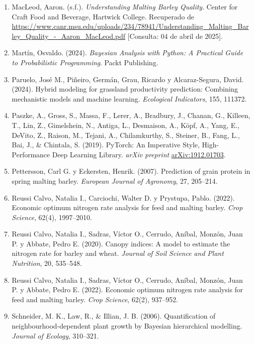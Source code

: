 \documentclass[
11pt, %
]{charter}
\begin{document}
\begin{enumerate}
    \item MacLeod, Aaron. (s.f.). \emph{Understanding Malting Barley Quality}. Center for Craft Food and Beverage, Hartwick College. Recuperado de \url{https://www.canr.msu.edu/uploads/234/78941/Understanding_Malting_Barley_Quality_-_Aaron_MacLeod.pdf} [Consulta: 04 de abril de 2025].

    \item Martín, Osvaldo. (2024). \emph{Bayesian Analysis with Python: A Practical Guide to Probabilistic Programming}. Packt Publishing.

    \item Paruelo, José M., Piñeiro, Germán, Grau, Ricardo y Alcaraz-Segura, David. (2024). Hybrid modeling for grassland productivity prediction: Combining mechanistic models and machine learning. \emph{Ecological Indicators}, 155, 111372.

    \item Paszke, A., Gross, S., Massa, F., Lerer, A., Bradbury, J., Chanan, G., Killeen, T., Lin, Z., Gimelshein, N., Antiga, L., Desmaison, A., Köpf, A., Yang, E., DeVito, Z., Raison, M., Tejani, A., Chilamkurthy, S., Steiner, B., Fang, L., Bai, J., \& Chintala, S. (2019). PyTorch: An Imperative Style, High-Performance Deep Learning Library. \emph{arXiv preprint} \url{arXiv:1912.01703}.

    \item Pettersson, Carl G. y Eckersten, Henrik. (2007). Prediction of grain protein in spring malting barley. \emph{European Journal of Agronomy}, 27, 205–214.

    \item Reussi Calvo, Natalia I., Carciochi, Walter D. y Prystupa, Pablo. (2022). Economic optimum nitrogen rate analysis for feed and malting barley. \emph{Crop Science}, 62(4), 1997–2010.

    \item Reussi Calvo, Natalia I., Sadras, Víctor O., Cerrudo, Aníbal, Monzón, Juan P. y Abbate, Pedro E. (2020). Canopy indices: A model to estimate the nitrogen rate for barley and wheat. \emph{Journal of Soil Science and Plant Nutrition}, 20, 535–548.

    \item Reussi Calvo, Natalia I., Sadras, Víctor O., Cerrudo, Aníbal, Monzón, Juan P. y Abbate, Pedro E. (2022). Economic optimum nitrogen rate analysis for feed and malting barley. \emph{Crop Science}, 62(2), 937–952.

    \item Schneider, M. K., Law, R., \& Illian, J. B. (2006). Quantification of neighbourhood-dependent plant growth by Bayesian hierarchical modelling. \emph{Journal of Ecology}, 310–321.


\end{enumerate}
\end{document}
